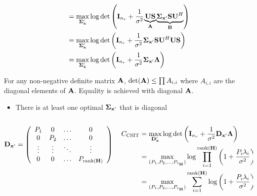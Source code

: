 \documentclass[xcolor=dvipsnames,aspectratio=169]{beamer}
\begin{document}
{\begin{equation*}
\begin{split}
                         &= \max_{\mathbf{\boldsymbol{\Sigma}}_{\mathbf{x}}'}\log\det \left(\mathbf{I}_{n_r}+\frac{1}{\sigma^2}\underset{\mathbf{A}}{\underbrace{\mathbf{U}\mathbf{S}}}\underset{\mathbf{B}}{\underbrace{\mathbf{\boldsymbol{\Sigma}}_{\mathbf{x}'}\mathbf{S}\mathbf{U}^H}}\right)\\
                         &= \max_{\mathbf{\boldsymbol{\Sigma}}_{\mathbf{x}}'}\log\det \left(\mathbf{I}_{n_r}+\frac{1}{\sigma^2}\mathbf{\boldsymbol{\Sigma}}_{\mathbf{x}'}\mathbf{S}\mathbf{U}^H\mathbf{U}\mathbf{S}\right)\\
                         &= \max_{\mathbf{\boldsymbol{\Sigma}}_{\mathbf{x}}'}\log\det \left(\mathbf{I}_{n_r}+\frac{1}{\sigma^2}\mathbf{\boldsymbol{\Sigma}}_{\mathbf{x}'}\mathbf{\boldsymbol{\Lambda}}\right)\\
  \end{split}
 \end{equation*}
 \pagebreak
 \begin{theorem}
  For any non-negative definite matrix $\mathbf{A}$, $\det(\mathbf{A})\leq \prod A_{i,i}$ where $A_{i,i}$ are the diagonal elements of $\mathbf{A}$. Equality is achieved with diagonal $\mathbf{A}$.
 \end{theorem}
 \begin{itemize}
  \item There is at least one optimal $\mathbf{\boldsymbol{\Sigma}}_{\mathbf{x}'}$ that is diagonal
 \end{itemize}
\begin{columns}
 \begin{column}{6cm}
  $$\mathbf{D}_{\mathbf{x}'}=\left(\begin{array}{cccc}
 P_1&0&\dots&0\\
 0&P_2&\dots&0\\
 \vdots&\vdots&\ddots&\vdots\\
 0&0&\dots&P_{\textnormal{rank}(\mathbf{H})}\\
\end{array}\right)$$  
 \end{column}
 \begin{column}{6cm}
 \begin{equation*}
  \begin{split}
    C_{\textnormal{CSIT}}&= \max_{\mathbf{D}_{\mathbf{x}}'}\log\det \left(\mathbf{I}_{n_r}+\frac{1}{\sigma^2}\mathbf{D}_{\mathbf{x}'}\mathbf{\boldsymbol{\Lambda}}\right)\\
        &= \max_{(P_1,P_2,\dots,P_{r_{\mathbf{H}}})}\log\prod_{i=1}^{\textnormal{rank}(\mathbf{H})} \left(1+\frac{P_i\lambda_i}{\sigma^2}\right)\\
        &= \max_{(P_1,P_2,\dots,P_{r_{\mathbf{H}}})}\sum_{i=1}^{\textnormal{rank}(\mathbf{H})}\log \left(1+\frac{P_i\lambda_i}{\sigma^2}\right)\\
  \end{split}
 \end{equation*}
 \end{column}
\end{columns}
}
\end{document}
